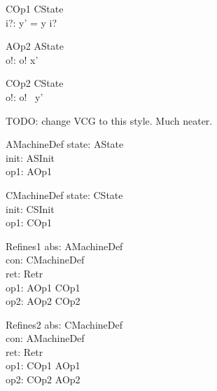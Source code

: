 \begin{schema}{COp1}
   \Delta CState \\
   i?: \nat
\where
   y' = y \cat \langle i? \rangle
\end{schema}

\begin{schema}{AOp2}
   \Xi AState \\
   o!: \nat
\where
    o! \in  x'
\end{schema}

\begin{schema}{COp2}
   \Xi CState \\
   o!: \nat
\where
   o! \in \ran~y'
\end{schema}

TODO: change VCG to this style. Much neater.

\begin{schema}{AMachineDef}
   state: AState \\
   init: ASInit \\
   op1: AOp1
\end{schema}

\begin{schema}{CMachineDef}
   state: CState \\
   init: CSInit \\
   op1: COp1
\end{schema}

\begin{schema}{Refines1}
   abs: AMachineDef \\
   con: CMachineDef \\
   ret: Retr \\
   op1: AOp1 \cross COp1 \\
   op2: AOp2 \cross COp2
\end{schema}

\begin{schema}{Refines2}
   abs: CMachineDef \\
   con: AMachineDef \\
   ret: Retr \\
   op1: COp1 \cross AOp1 \\
   op2: COp2 \cross AOp2
\end{schema}
